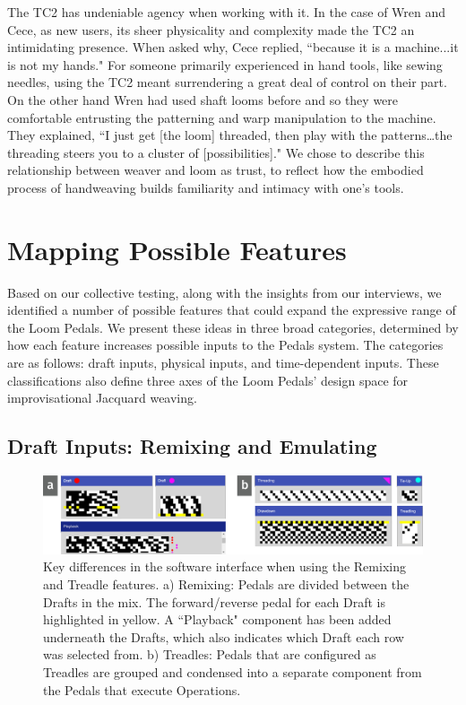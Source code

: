 The TC2 has undeniable agency when working with it. In the case of Wren and Cece, as new users, its sheer physicality and complexity made the TC2 an intimidating presence. When asked why, Cece replied, “because it is a machine...it is not my hands." For someone primarily experienced in hand tools, like sewing needles, using the TC2 meant surrendering a great deal of control on their part. On the other hand Wren had used shaft looms before and so they were comfortable entrusting the patterning and warp manipulation to the machine. They explained, “I just get [the loom] threaded, then play with the patterns…the threading steers you to a cluster of [possibilities]." We chose to describe this relationship between weaver and loom as trust, to reflect how the embodied process of handweaving builds familiarity and intimacy with one’s tools. 

\section{Mapping Possible Features}
\label{sect_poss-features}

Based on our collective testing, along with the insights from our interviews, we identified a number of possible features that could expand the expressive range of the Loom Pedals. We present these ideas in three broad categories, determined by how each feature increases possible inputs to the Pedals system. The categories are as follows: draft inputs, physical inputs, and time-dependent inputs. These classifications also define three axes of the Loom Pedals' design space for improvisational Jacquard weaving.

\subsection{Draft Inputs: Remixing and Emulating}

\begin{figure}
    \centering
    \includegraphics[width=\linewidth]{figs/LP_fig_draft-inputs.png}
    \caption[Key differences in AdaCAD with Remixing and Treadle features.]{Key differences in the software interface when using the Remixing and Treadle features. a) Remixing: Pedals are divided between the Drafts in the mix. The forward/reverse pedal for each Draft is highlighted in yellow. A ``Playback" component has been added underneath the Drafts, which also indicates which Draft each row was selected from. b) Treadles: Pedals that are configured as Treadles are grouped and condensed into a separate component from the Pedals that execute Operations.}
    \label{fig:remixing-emulating}
\end{figure}

